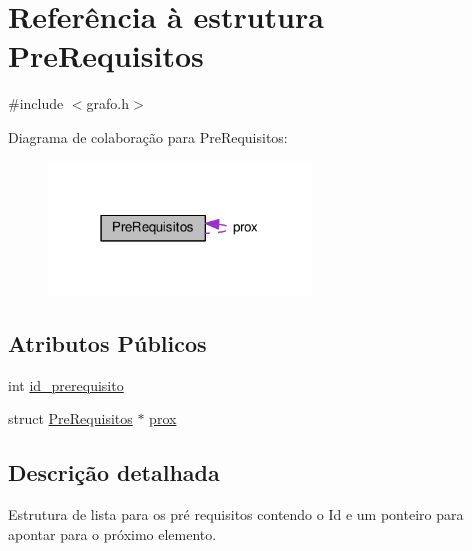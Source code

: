 \hypertarget{structPreRequisitos}{\section{Referência à estrutura Pre\-Requisitos}
\label{structPreRequisitos}
}


{\ttfamily \#include $<$grafo.\-h$>$}



Diagrama de colaboração para Pre\-Requisitos\-:\nopagebreak
\begin{figure}[H]
\begin{center}
\leavevmode
\includegraphics[width=198pt]{structPreRequisitos__coll__graph}
\end{center}
\end{figure}
\subsection*{Atributos Públicos}
\begin{DoxyCompactItemize}
\item 
int \hyperlink{structPreRequisitos_aac895640418edfa91ba7c8f01b91459e}{id\-\_\-prerequisito}
\item 
struct \hyperlink{structPreRequisitos}{Pre\-Requisitos} $\ast$ \hyperlink{structPreRequisitos_ac5ae4b6f87e80302c8f902b5d5ac411a}{prox}
\end{DoxyCompactItemize}


\subsection{Descrição detalhada}
Estrutura de lista para os pré requisitos contendo o Id e um ponteiro para apontar para o próximo elemento. 

